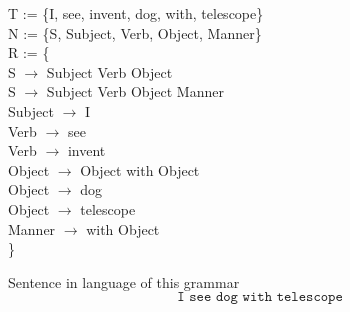 \documentclass[t,usenames,dvipsnames]{beamer} %
\newcommand{\pgrammar}{
    R :  \\
    S $\to$ Subject Verb Object [0.3] \\
    S $\to$ Subject Verb Object Manner [0.7] \\
    Manner $\to$ with Object [1] \\
    Verb $\to$ see [0.9] \\
    Verb $\to$ invent [0.1] \\
    Subject $\to$ Subject with Subject [0.2] \\
    Subject $\to$ dog [0.3] \\
    Subject $\to$ telescope [0.5]
}
\newcommand{\1}{\boldsymbol{1}}
\newcommand{\0}{\boldsymbol{0}}
\begin{document}


\begin{frame}
T := \{I, see, invent, dog, with, telescope\} \\
N := \{S, Subject, Verb, Object, Manner\} \\
R := \{ \\
    S $\to$ Subject Verb Object  \\
    S $\to$ Subject Verb Object Manner  \\
    Subject $\to$ I  \\
    Verb $\to$ see  \\
    Verb $\to$ invent  \\
    Object $\to$ Object with Object  \\
    Object $\to$ dog  \\
    Object $\to$ telescope  \\
    Manner $\to$ with Object  \\

\}
\invisible


\begin{block}{Sentence in language of this grammar}
\[ \texttt{I see dog with telescope} \]
\end{block}

\end{frame}
\end{document}
